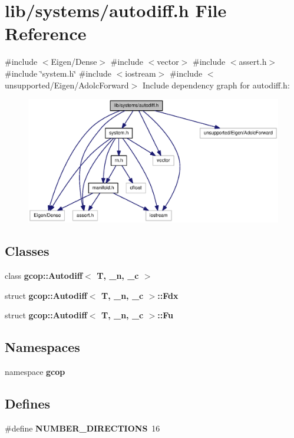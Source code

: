 \section{lib/systems/autodiff.h \-File \-Reference}
\label{autodiff_8h}
{\ttfamily \#include $<$\-Eigen/\-Dense$>$}\*
{\ttfamily \#include $<$vector$>$}\*
{\ttfamily \#include $<$assert.\-h$>$}\*
{\ttfamily \#include \char`\"{}system.\-h\char`\"{}}\*
{\ttfamily \#include $<$iostream$>$}\*
{\ttfamily \#include $<$unsupported/\-Eigen/\-Adolc\-Forward$>$}\*
\-Include dependency graph for autodiff.\-h\-:\nopagebreak
\begin{figure}[H]
\begin{center}
\leavevmode
\includegraphics[width=350pt]{autodiff_8h__incl}
\end{center}
\end{figure}
\subsection*{\-Classes}
\begin{DoxyCompactItemize}
\item 
class {\bf gcop\-::\-Autodiff$<$ T, \-\_\-n, \-\_\-c $>$}
\item 
struct {\bf gcop\-::\-Autodiff$<$ T, \-\_\-n, \-\_\-c $>$\-::\-Fdx}
\item 
struct {\bf gcop\-::\-Autodiff$<$ T, \-\_\-n, \-\_\-c $>$\-::\-Fu}
\end{DoxyCompactItemize}
\subsection*{\-Namespaces}
\begin{DoxyCompactItemize}
\item 
namespace {\bf gcop}
\end{DoxyCompactItemize}
\subsection*{\-Defines}
\begin{DoxyCompactItemize}
\item 
\#define {\bf \-N\-U\-M\-B\-E\-R\-\_\-\-D\-I\-R\-E\-C\-T\-I\-O\-N\-S}~16
\end{DoxyCompactItemize}


